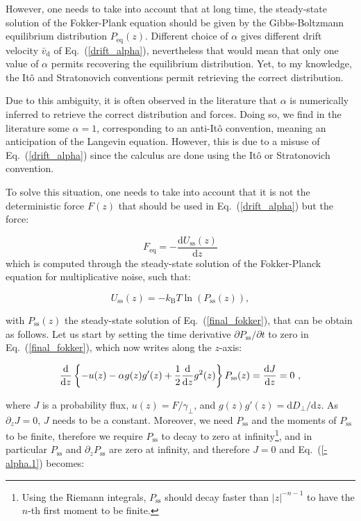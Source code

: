 However, one needs to take into account that at long time, the steady-state solution of the Fokker-Plank equation should be given by the Gibbs-Boltzmann equilibrium distribution $P_\mathrm{eq}(z)$. Different choice of $\alpha$ gives different drift velocity $\bar{v}_\mathrm{d}$ of Eq.~(\ref{drift_alpha}), nevertheless that would mean that only one value of $\alpha$ permits recovering the equilibrium distribution. Yet, to my knowledge, the Itô and Stratonovich conventions permit retrieving the correct distribution. 

Due to this ambiguity, it is often observed in the literature that $\alpha$ is numerically inferred to retrieve the correct distribution and forces. Doing so, we find in the literature some $\alpha =1$, corresponding to an anti-Itô convention, meaning an anticipation of the Langevin equation. However, this is due to a misuse of Eq.~(\ref{drift_alpha}) since the calculus are done using the Itô or Stratonovich convention.   

To solve this situation, one needs to take into account that it is not the deterministic force $F(z)$ that should be used in Eq.~(\ref{drift_alpha}) but the force:

\begin{equation}
	F_\mathrm{eq} = - \frac{\mathrm{d}U_\mathrm{ss}(z)}{\mathrm{d}z}
	\label{Feq}
\end{equation}
which is computed through the steady-state solution of the Fokker-Planck equation for multiplicative noise, such that:

\begin{equation}
	U_\mathrm{ss} (z) = - k_\mathrm{B}T \ln (P_\mathrm{ss}(z)),
	\label{Uss}
\end{equation}


with $P_\mathrm{ss}(z)$ the steady-state solution of Eq.~(\ref{final_fokker}), that can be obtain as follows. Let us start by setting the time derivative $\partial P_\mathrm{ss} / \partial t$ to zero in Eq.~(\ref{final_fokker}), which now writes along the $z$-axis:

\begin{equation}
	\frac{\textnormal{d}}{\textnormal{d} z} \left\{ -u(z) - \alpha g(z)g'(z) + \frac{1}{2}\frac{\textnormal{d} }{\textnormal{d} z} g^2(z)  \right\} P_\mathrm{ss}(z)= \frac{\textnormal{d} J}{\textnormal{d} z} = 0~,
	\label{-alpha.1}
\end{equation}

where $J$ is a probability flux, $u(z) = F/\gamma_\bot$, and $g(z)g'(z) = \mathrm{d}D_\bot / \mathrm{d}z $. As $\partial _z J =0$, $J$ needs to be a constant. Moreover, we need $P_\mathrm{ss}$ and the moments of $P_\mathrm{ss}$ to be finite, therefore we require $P_\mathrm{ss}$ to decay to zero at infinity\footnote{Using the Riemann integrals, $P_\mathrm{ss}$ should decay faster than $|z|^{-n-1}$ to have the $n$-th first moment to be finite.}, and in particular $P_\mathrm{ss}$ and $\partial_z P_\mathrm{ss}$ are zero at infinity, and therefore $J=0$ and Eq.~(\ref{-alpha.1}) becomes:

